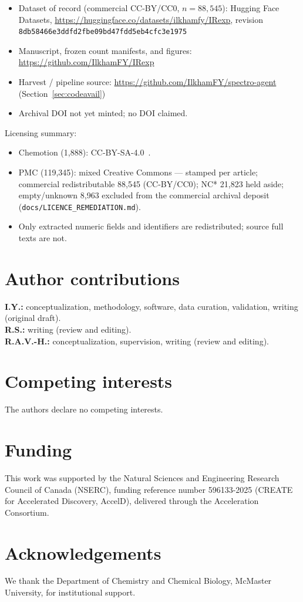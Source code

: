 \documentclass[pdflatex,sn-nature]{sn-jnl}
\begin{document}
\begin{itemize}
  \item Dataset of record (commercial CC-BY/CC0, $n=88{,}545$): Hugging Face
        Datasets, \url{https://huggingface.co/datasets/ilkhamfy/IRexp}, revision
        \texttt{8db58466e3ddfd2fbe09bd47fdd5eb4cfc3e1975}
  \item Manuscript, frozen count manifests, and figures:
        \url{https://github.com/IlkhamFY/IRexp}
  \item Harvest / pipeline source: \url{https://github.com/IlkhamFY/spectro-agent}
        (Section~\ref{sec:codeavail})
  \item Archival DOI not yet minted; no DOI claimed.
\end{itemize}

Licensing summary:
\begin{itemize}
  \item Chemotion (1,888): CC-BY-SA-4.0~\citep{chemotion2024}.
  \item PMC (119,345): mixed Creative Commons --- stamped per article; commercial
        redistributable 88,545 (CC-BY/CC0); NC* 21,823 held aside; empty/unknown
        8,963 excluded from the commercial archival deposit
        (\texttt{docs/LICENCE\_REMEDIATION.md}).
  \item Only extracted numeric fields and identifiers are redistributed; source full
        texts are not.
\end{itemize}

\section*{Author contributions}

\textbf{I.Y.:} conceptualization, methodology, software, data curation, validation,
writing (original draft).\\
\textbf{R.S.:} writing (review and editing).\\
\textbf{R.A.V.-H.:} conceptualization, supervision, writing (review and editing).

\section*{Competing interests}

The authors declare no competing interests.

\section*{Funding}

This work was supported by the Natural Sciences and Engineering Research Council
of Canada (NSERC), funding reference number 596133-2025 (CREATE for Accelerated
Discovery, AccelD), delivered through the Acceleration Consortium.

\section*{Acknowledgements}

We thank the Department of Chemistry and Chemical Biology, McMaster University,
for institutional support.


\end{document}

